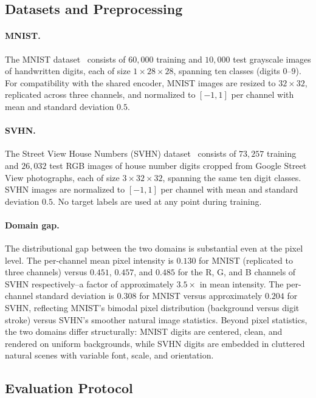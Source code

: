 \documentclass{article}
\begin{document}
	\subsection{Datasets and Preprocessing}
	
	\paragraph{MNIST.} The MNIST dataset~\citep{lecun} consists of $60{,}000$ training and $10{,}000$ test grayscale images of handwritten digits, each of size $1 \times 28 \times 28$, spanning ten classes (digits $0$--$9$). For compatibility with the shared encoder, MNIST images are resized to $32 \times 32$, replicated across three channels, and normalized to $[-1, 1]$ per channel with mean and standard deviation $0.5$.
	
	\paragraph{SVHN.} The Street View House Numbers (SVHN) dataset~\citep{yuval} consists of $73{,}257$ training and $26{,}032$ test RGB images of house number digits cropped from Google Street View photographs, each of size $3 \times 32 \times 32$, spanning the same ten digit classes. SVHN images are normalized to $[-1, 1]$ per channel with mean and standard deviation $0.5$. No target labels are used at any point during training.
	
	\paragraph{Domain gap.} The distributional gap between the two domains is substantial even at the pixel level. The per-channel mean pixel intensity is $0.130$ for MNIST (replicated to three channels) versus $0.451$, $0.457$, and $0.485$ for the R, G, and B channels of SVHN respectively--a factor of approximately $3.5\times$ in mean intensity. The per-channel standard deviation is $0.308$ for MNIST versus approximately $0.204$ for SVHN, reflecting MNIST's bimodal pixel distribution (background versus digit stroke) versus SVHN's smoother natural image statistics. Beyond pixel statistics, the two domains differ structurally: MNIST digits are centered, clean, and rendered on uniform backgrounds, while SVHN digits are embedded in cluttered natural scenes with variable font, scale, and orientation.
	
	\subsection{Evaluation Protocol}
	
\end{document}
